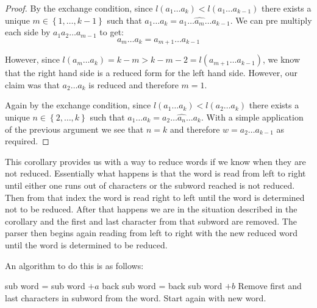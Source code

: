 \documentclass[a4paper,12pt]{article}
\begin{document}
\begin{proof}
	By the exchange condition, since $l(a_1 \ldots a_k) < l(a_1 \ldots a_{k-1})$ there exists a unique $m \in \left\{1, \ldots, k - 1\right\}$ such that $a_1 \ldots a_k = a_1 \ldots \hat{a_m} \ldots a_{k-1}$. We can pre multiply each side by $a_1a_2 \ldots a_{m-1}$ to get:
	\[a_m \ldots a_k = a_{m+1} \ldots a_{k-1}\]
	
	However, since $l(a_m \ldots a_k) = k-m > k-m-2 = l(a_{m+1} \ldots a_{k-1})$, we know that the right hand side is a reduced form for the left hand side. However, our claim was that $a_2 \ldots a_k$ is reduced and therefore $m = 1$. 
	
	Again by the exchange condition, since $l(a_1 \ldots a_k) < l(a_2 \ldots a_k)$ there exists a unique $n \in \left\{2, \ldots, k\right\}$ such that $a_1 \ldots a_k = a_2 \ldots \hat{a_n} \ldots a_k$. With a simple application of the previous argument we see that $n = k$ and therefore $w = a_2 \ldots a_{k-1}$ as required.
\end{proof}

This corollary provides us with a way to reduce words if we know when they are not reduced. Essentially what happens is that the word is read from left to right until either one runs out of characters or the subword reached is not reduced. Then from that index the word is read right to left until the word is determined not to be reduced. After that happens we are in the situation described in the corollary and the first and last character from that subword are removed. The parser then begins again reading from left to right with the new reduced word until the word is determined to be reduced.

An algorithm to do this is as follows:

\begin{algorithmic}[1]
		\STATE sub word = sub word $+ a$
				\STATE back sub word = back sub word $+ b$
					\STATE Remove first and last characters in subword from the word.
					\STATE Start again with new word.
				\ENDIF
			\ENDFOR
		\ENDIF
	\ENDFOR
\end{algorithmic}
\end{document}
